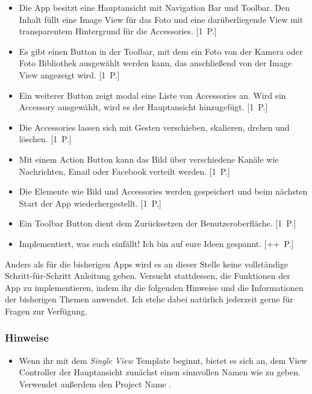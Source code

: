 \documentclass[parskip=half, final]{scrreprt}
\begin{document}
\begin{lecture}
\begin{itemize}
	\item Die App besitzt eine Hauptansicht mit Navigation Bar und Toolbar. Den Inhalt füllt eine Image View für das Foto und eine darüberliegende View mit transparentem Hintergrund für die Accessories. [1~P.]
	\item Es gibt einen Button in der Toolbar, mit dem ein Foto von der Kamera oder Foto Bibliothek ausgewählt werden kann, das anschließend von der Image View angezeigt wird. [1~P.]
	\item Ein weiterer Button zeigt modal eine Liste von Accessories an. Wird ein Accessory ausgewählt, wird es der Hauptansicht hinzugefügt. [1~P.]
	\item Die Accessories lassen sich mit Gesten verschieben, skalieren, drehen und löschen. [1~P.]
	\item Mit einem Action Button kann das Bild über verschiedene Kanäle wie Nachrichten, Email oder Facebook verteilt werden. [1~P.]
	\item Die Elemente wie Bild und Accessories werden gespeichert und beim nächsten Start der App wiederhergestellt. [1~P.]
	\item Ein Toolbar Button dient dem Zurücksetzen der Benutzeroberfläche. [1~P.]
	\item Implementiert, was euch einfällt! Ich bin auf eure Ideen gespannt. [++~P.]
\end{itemize}

Anders als für die bisherigen Apps wird es an dieser Stelle keine vollständige Schritt-für-Schritt Anleitung geben. Versucht stattdessen, die Funktionen der App zu implementieren, indem ihr die folgenden Hinweise und die Informationen der bisherigen Themen anwendet. Ich stehe dabei natürlich jederzeit gerne für Fragen zur Verfügung.

\subsubsection{Hinweise}

\begin{itemize}

\item Wenn ihr mit dem \emph{Single View} Template beginnt, bietet es sich an, dem View Controller der Hauptansicht zunächst einen sinnvollen Namen wie  zu geben. Verwendet außerdem den Project Name .


\end{itemize}
\end{lecture}
\end{document}
